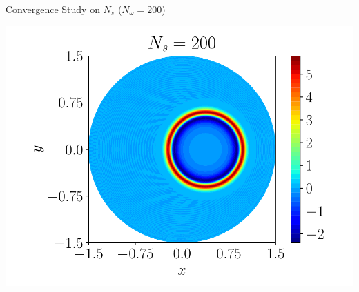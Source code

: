 \documentclass{beamer}
\begin{document}
\begin{frame}{Convergence Study on $N_s$ \quad ($N_\omega = 200$)}
{	\begin{minipage}{0.38\linewidth}
		\includegraphics[width=\linewidth]{figures/Physical_Solution_Nonsymmetric_200_Ns.pdf} 
	\end{minipage}
	}
	\centering
\end{frame}
\end{document}
